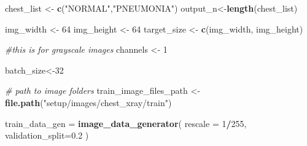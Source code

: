\documentclass[12pt]{article}
\newenvironment{Shaded}{\begin{snugshade}}{\end{snugshade}}
\newcommand{\CommentTok}[1]{\textcolor[rgb]{0.56,0.35,0.01}{\textit{#1}}}
\newcommand{\DataTypeTok}[1]{\textcolor[rgb]{0.13,0.29,0.53}{#1}}
\newcommand{\DecValTok}[1]{\textcolor[rgb]{0.00,0.00,0.81}{#1}}
\newcommand{\FloatTok}[1]{\textcolor[rgb]{0.00,0.00,0.81}{#1}}
\newcommand{\KeywordTok}[1]{\textcolor[rgb]{0.13,0.29,0.53}{\textbf{#1}}}
\newcommand{\NormalTok}[1]{#1}
\newcommand{\OperatorTok}[1]{\textcolor[rgb]{0.81,0.36,0.00}{\textbf{#1}}}
\newcommand{\StringTok}[1]{\textcolor[rgb]{0.31,0.60,0.02}{#1}}
\begin{document}
\begin{Shaded}
\begin{Highlighting}[]
\NormalTok{chest_list <-}\StringTok{ }\KeywordTok{c}\NormalTok{(}\StringTok{"NORMAL"}\NormalTok{,}\StringTok{"PNEUMONIA"}\NormalTok{)}
\NormalTok{output_n<-}\KeywordTok{length}\NormalTok{(chest_list)}

\NormalTok{img_width <-}\StringTok{ }\DecValTok{64}
\NormalTok{img_height <-}\StringTok{ }\DecValTok{64}
\NormalTok{target_size <-}\StringTok{ }\KeywordTok{c}\NormalTok{(img_width, img_height)}

\CommentTok{#this is for grayscale images}
\NormalTok{channels <-}\StringTok{ }\DecValTok{1}

\NormalTok{batch_size<-}\DecValTok{32}

\CommentTok{# path to image folders}
\NormalTok{train_image_files_path <-}\StringTok{ }\KeywordTok{file.path}\NormalTok{(}\StringTok{"setup/images/chest_xray/train"}\NormalTok{)}
\end{Highlighting}
\end{Shaded}

\begin{Shaded}
\begin{Highlighting}[]
\NormalTok{train_data_gen =}\StringTok{ }\KeywordTok{image_data_generator}\NormalTok{(}
  \DataTypeTok{rescale =} \DecValTok{1}\OperatorTok{/}\DecValTok{255}\NormalTok{,}
  \DataTypeTok{validation_split=}\FloatTok{0.2}
\NormalTok{)}
\end{Highlighting}
\end{Shaded}
\end{document}

